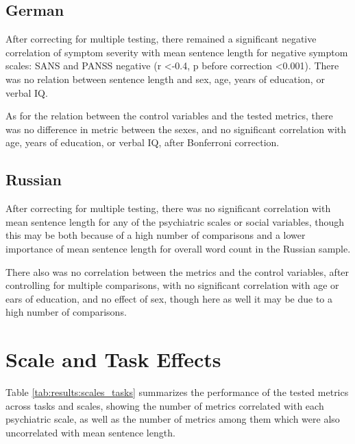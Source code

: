 \subsection{German}

After correcting for multiple testing, there remained a significant negative correlation of symptom severity with mean sentence length for negative symptom scales: SANS and PANSS negative (r \textless -0.4, p before correction \textless 0.001). There was no relation between sentence length and sex, age, years of education, or verbal IQ. 

As for the relation between the control variables and the tested metrics, there was no difference in metric between the sexes, and no significant correlation with age, years of education, or verbal IQ, after Bonferroni correction.

\subsection{Russian}

After correcting for multiple testing, there was no significant correlation with mean sentence length for any of the psychiatric scales or social variables, though this may be both because of a high number of comparisons and a lower importance of mean sentence length for overall word count in the Russian sample. 

There also was no correlation between the metrics and the control variables, after controlling for multiple comparisons, with no significant correlation with age or ears of education, and no effect of sex, though here as well it may be due to a high number of comparisons.


\section{Scale and Task Effects}

Table \ref{tab:results:scales_tasks} summarizes the performance of the tested metrics across tasks and scales, showing the number of metrics correlated with each psychiatric scale, as well as the number of metrics among them which were also uncorrelated with mean sentence length.

